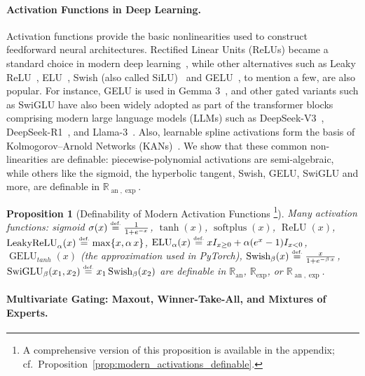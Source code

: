 \documentclass{article}
\newcommand{\eqdef}{\ensuremath{\stackrel{\mbox{\upshape\tiny def.}}{=}}}
\theoremstyle{plain}
\newtheorem{proposition}[theorem]{Proposition}
\theoremstyle{definition}
\theoremstyle{remark}
\theoremstyle{plain}
\numberwithin{thm}{section}
\theoremstyle{definition}
\numberwithin{equation}{section}
\begin{document}
\paragraph{Activation Functions in Deep Learning.}
Activation functions provide the basic nonlinearities used to construct
feedforward neural architectures. Rectified Linear Units (ReLUs) became a standard choice in modern deep learning~\citep{nair2010rectified,glorot2011deep}, while other alternatives such as Leaky ReLU~\citep{Maas2013Rectifier}, ELU~\citep{Clevert2016ELU}, Swish (also called SiLU)~\citep{ramachandran2017searching} and GELU~\citep{hendrycks2016gelu}, to mention a few, are also popular. For instance, GELU is used in Gemma 3~\citep{gemmateam2025gemma3technicalreport}, and other gated variants such as SwiGLU have also been widely adopted as part of the transformer blocks~\citep{shazeer2020glu} comprising modern large language models (LLMs) such as DeepSeek-V3~\citep{deepseekai2025deepseekv3technicalreport}, DeepSeek-R1~\citep{Guo_2025}, and Llama-3~\citep{grattafiori2024llama3herdmodels}. Also, learnable spline activations
form the basis of Kolmogorov--Arnold Networks (KANs)~\citep{liu2025kan}.
We show that these common non-linearities are definable: piecewise-polynomial
activations are semi-algebraic, while others like the sigmoid, the hyperbolic tangent, Swish, GELU, SwiGLU and more, are definable
in $\mathbb{R}_{\operatorname{an},\exp}$.

\begin{proposition}[Definability of Modern Activation Functions%
\footnote{A comprehensive version of this proposition is available in the appendix; cf.\ Proposition~\ref{prop:modern_activations_definable}.}]
\label{prop:modern_activations_definable__compressed}
Many activation functions: sigmoid $\sigma(x)\eqdef \tfrac{1}{1+e^{-x}}$, $\tanh(x)$, $\operatorname{softplus}(x)$, $\operatorname{ReLU}(x)$, $\operatorname{LeakyReLU}_{\alpha}(x)\eqdef \max\{x,\alpha\,x\}$, $\operatorname{ELU}_{\alpha}(x)\eqdef xI_{x\ge 0}+\alpha (e^x-1)I_{x<0}$, 
$\operatorname{GELU}_{tanh}(x)$ (the approximation used in PyTorch),
$\operatorname{Swish}_{\beta}(x)\eqdef \tfrac{x}{1+e^{-\beta\,x}}$, $\operatorname{SwiGLU}_{\beta}(x_1,x_2)\eqdef x_1\operatorname{Swish}_{\beta}(x_2)$ are definable in $\mathbb{R}_{\operatorname{an}}$, $\mathbb{R}_{\operatorname{exp}}$, or $\mathbb{R}_{\operatorname{an},\exp}$.
\end{proposition}

\paragraph{Multivariate Gating: Maxout, Winner-Take-All, and Mixtures of Experts.}
\end{document}
